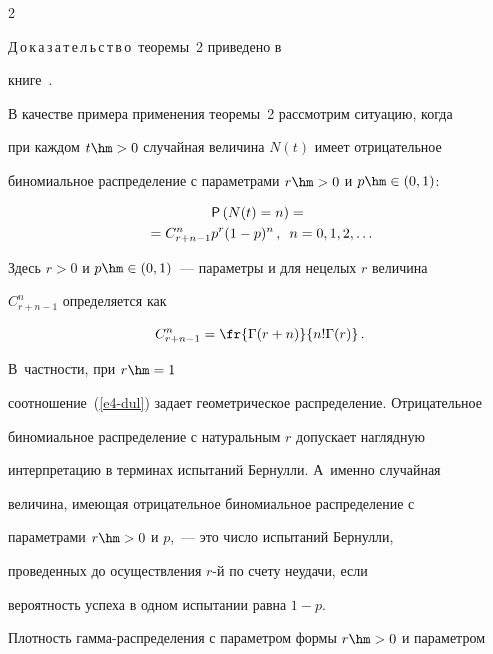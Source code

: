 \begin{multicols}{2}
\noindent


Д\,о\,к\,а\,з\,а\,т\,е\,л\,ь\,с\,т\,в\,о~теоремы~2 приведено в 


книге~\cite{KorolevSokolov2008}.





\smallskip





В качестве примера применения теоремы~2 рассмотрим ситуацию, когда


при каждом $t\hm>0$ случайная величина $N(t)$ имеет отрицательное


биномиальное распределение с параметрами $r\hm>0$ и $p\hm\in(0,1)$:


\begin{multline}


{\sf P}\left(N(t)=n\right)={}\\


{}= C_{r+n-1}^{n}p^r(1-p)^{n}\,,\enskip


n=0,1,2,\ldots


\label{e4-dul}


\end{multline}


Здесь $r>0$ и $p\hm\in(0,1)$~--- параметры и для нецелых $r$ величина


$C_{r+n-1}^{n}$ определяется как 


$$ 


C_{r+n-1}^{n} = \fr{\Gamma(r+n)}{n!\Gamma(r)}\,. 


$$ 


В~частности, при $r\hm=1$


соотношение~(\ref{e4-dul}) задает геометрическое распределение. Отрицательное


биномиальное распределение с натуральным $r$ допускает наглядную


интерпретацию в терминах испытаний Бернулли. А~именно случайная


величина, име\-ющая отрицательное биномиальное распределение с


параметрами $r\hm>0$ и $p$,~--- это число испытаний Бернулли,


проведенных до осуществления $r$-й по счету неудачи, если


вероятность успеха в одном испытании равна $1-p$.





Плотность гамма-распределения с параметром формы $r\hm>0$ и параметром



\end{multicols}
